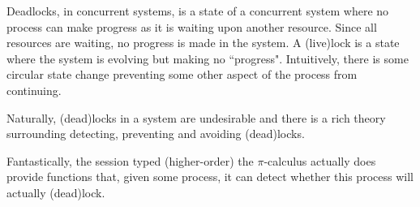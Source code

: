 Deadlocks, in concurrent systems, is a state of a concurrent system where no process can make progress as it is waiting upon another resource. Since all resources are waiting, no progress is made in the system. A (live)lock is a state where the system is evolving but making no ``progress". Intuitively, there is some circular state change preventing some other aspect of the process from continuing.

Naturally, (dead)locks in a system are undesirable and there is a rich theory  surrounding detecting, preventing and avoiding (dead)locks.

Fantastically, the session typed (higher-order) the $\pi$-calculus actually does provide functions that, given some process, it can detect whether this process will actually (dead)lock. 

